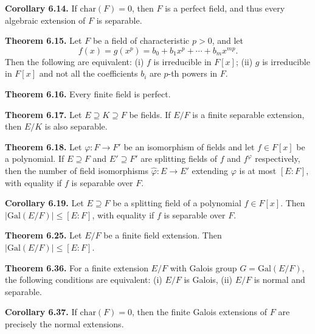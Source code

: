 \documentclass{article}
\newenvironment{theoremx}[1]{\noindent\textbf{Theorem #1.} }{\par}
\newenvironment{corollaryx}[1]{\noindent\textbf{Corollary #1.} }{\par}
\begin{document}
\begin{corollaryx}{6.14}
If $\mathrm{char}(F)=0$, then $F$ is a perfect field, and thus every algebraic extension of $F$ is separable.
\end{corollaryx}

\begin{theoremx}{6.15}
Let $F$ be a field of characteristic $p>0$, and let 
\[
  f(x) = g(x^p) = b_0 + b_1x^p + \cdots + b_m x^{mp}.
\]
Then the following are equivalent:
(i) $f$ is irreducible in $F[x]$;
(ii) $g$ is irreducible in $F[x]$ and not all the coefficients $b_i$ are $p$-th powers in $F$.
\end{theoremx}

\begin{theoremx}{6.16}
Every finite field is perfect.
\end{theoremx}

\begin{theoremx}{6.17}
Let $E\supseteq K\supseteq F$ be fields.  If $E/F$ is a finite separable extension, then $E/K$ is also separable.
\end{theoremx}

\begin{theoremx}{6.18}
Let $\varphi:F\to F'$ be an isomorphism of fields and let $f\in F[x]$ be a polynomial.  If $E\supseteq F$ and $E'\supseteq F'$ are splitting fields of $f$ and $f^\varphi$ respectively, then the number of field isomorphisms $\hat\varphi:E\to E'$ extending $\varphi$ is at most $[E:F]$, with equality if $f$ is separable over $F$.
\end{theoremx}

\begin{corollaryx}{6.19}
Let $E\supseteq F$ be a splitting field of a polynomial $f\in F[x]$.  Then $|\mathrm{Gal}(E/F)|\le [E:F]$, with equality if $f$ is separable over $F$.
\end{corollaryx}

\begin{theoremx}{6.25}
Let $E/F$ be a finite field extension.  Then $|\mathrm{Gal}(E/F)| \le [E:F]$.
\end{theoremx}

\begin{theoremx}{6.36}
For a finite extension $E/F$ with Galois group $G=\mathrm{Gal}(E/F)$, the following conditions are equivalent:
(i) $E/F$ is Galois,
(ii) $E/F$ is normal and separable.
\end{theoremx}

\begin{corollaryx}{6.37}
If $\mathrm{char}(F)=0$, then the finite Galois extensions of $F$ are precisely the normal extensions.
\end{corollaryx}
\end{document}
